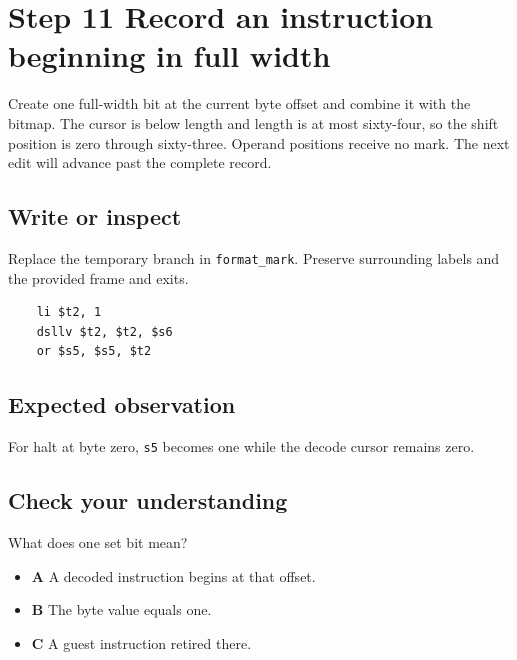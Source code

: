 \section{Step 11 Record an instruction beginning in full width}\label{vm-s11}

Create one full-width bit at the current byte offset and combine it with the bitmap. The cursor is below length and length is at most sixty-four, so the shift position is zero through sixty-three. Operand positions receive no mark. The next edit will advance past the complete record.

\subsection{Write or inspect}
Replace the temporary branch in \texttt{format\_mark}. Preserve surrounding labels and the provided frame and exits.

\begin{verbatim}
    li $t2, 1
    dsllv $t2, $t2, $s6
    or $s5, $s5, $t2
\end{verbatim}
\subsection{Expected observation}
For halt at byte zero, \texttt{s5} becomes one while the decode cursor remains zero.

\subsection{Check your understanding}
What does one set bit mean?

\begin{itemize}
  \item \textbf{A} A decoded instruction begins at that offset.
  \item \textbf{B} The byte value equals one.
  \item \textbf{C} A guest instruction retired there.
\end{itemize}

